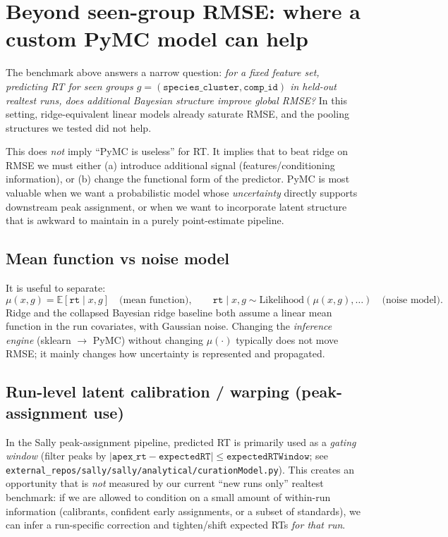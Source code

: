 \documentclass[11pt]{article}
\begin{document}
\section{Beyond seen-group RMSE: where a custom PyMC model can help}

The benchmark above answers a narrow question: \emph{for a fixed feature set, predicting RT for seen groups
$g=(\texttt{species\_cluster},\texttt{comp\_id})$ in held-out realtest runs, does additional Bayesian structure improve global RMSE?}
In this setting, ridge-equivalent linear models already saturate RMSE, and the pooling structures we tested did not help.

This does \emph{not} imply ``PyMC is useless'' for RT. It implies that to beat ridge on RMSE we must either (a) introduce additional
signal (features/conditioning information), or (b) change the functional form of the predictor. PyMC is most valuable when we want a
probabilistic model whose \emph{uncertainty} directly supports downstream peak assignment, or when we want to incorporate latent
structure that is awkward to maintain in a purely point-estimate pipeline.

\subsection{Mean function vs noise model}

It is useful to separate:
\[
  \mu(x,g) = \mathbb{E}[\texttt{rt} \mid x,g] \quad \text{(mean function)}, \qquad
  \texttt{rt} \mid x,g \sim \text{Likelihood}(\mu(x,g), \ldots) \quad \text{(noise model)}.
\]
Ridge and the collapsed Bayesian ridge baseline both assume a linear mean function in the run covariates, with Gaussian noise.
Changing the \emph{inference engine} (sklearn $\rightarrow$ PyMC) without changing $\mu(\cdot)$ typically does not move RMSE; it mainly
changes how uncertainty is represented and propagated.

\subsection{Run-level latent calibration / warping (peak-assignment use)}

In the Sally peak-assignment pipeline, predicted RT is primarily used as a \emph{gating window} (filter peaks by
$|\texttt{apex\_rt}-\texttt{expectedRT}| \le \texttt{expectedRTWindow}$; see
\texttt{external\_repos/sally/sally/analytical/curationModel.py}).
This creates an opportunity that is \emph{not} measured by our current ``new runs only'' realtest benchmark:
if we are allowed to condition on a small amount of within-run information (calibrants, confident early assignments, or a subset of
standards), we can infer a run-specific correction and tighten/shift expected RTs \emph{for that run}.
\end{document}
